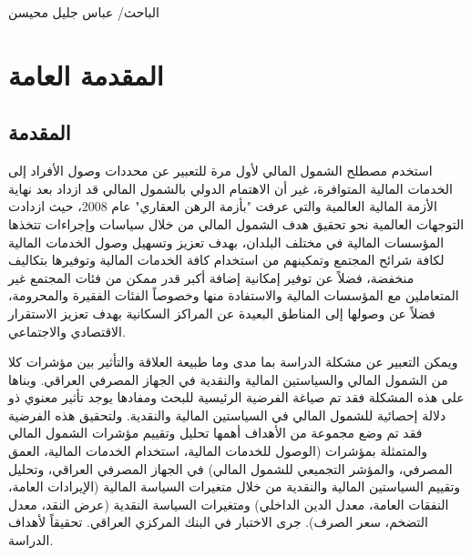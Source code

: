 \documentclass[10pt,a4paper]{report}
\begin{document}
\begin{doublespacing}
\bigskip
\bigskip
\bigskip
\begin{flushleft}
	\Large{الباحث/}
\Large{عباس جليل محيسن}
\end{flushleft}
\newpage

\tableofcontents	

\pagestyle{plain}
\cleardoublepage
{}%
\pagestyle{plain}
\listoftables
\cleardoublepage
\pagestyle{plain}
\listoffigures
{}%
\clearpage
{} 
\chapter*{المقدمة العامة}
\thispagestyle{empty}
\pagestyle{otherstyle}
\newpage
\section*{المقدمة}
استخدم مصطلح الشمول المالي لأول مرة للتعبير عن محددات وصول الأفراد إلى الخدمات المالية المتوافرة، غير أن الاهتمام الدولي بالشمول المالي قد ازداد بعد نهاية الأزمة المالية العالمية والتي عرفت "بأزمة الرهن العقاري" عام 2008، حيث ازدادت التوجهات العالمية نحو تحقيق هدف الشمول المالي من خلال سياسات وإجراءات تتخذها المؤسسات المالية في مختلف البلدان، بهدف تعزيز وتسهيل وصول الخدمات المالية لكافة شرائح المجتمع وتمكينهم من استخدام كافة الخدمات المالية وتوفيرها بتكاليف منخفضة، فضلاً عن توفير إمكانية إضافة أكبر قدر ممكن من فئات المجتمع غير المتعاملين مع المؤسسات المالية والاستفادة منها وخصوصاً الفئات الفقيرة والمحرومة، فضلاً عن وصولها إلى المناطق البعيدة عن المراكز السكانية بهدف تعزيز الاستقرار الاقتصادي والاجتماعي.

ويمكن التعبير عن مشكلة الدراسة بما مدى وما طبيعة العلاقة والتأثير بين مؤشرات كلا من الشمول المالي والسياستين المالية والنقدية في الجهاز المصرفي العراقي. وبناها على هذه المشكلة فقد تم صياغة الفرضية الرئيسية للبحث ومفادها يوجد تأثير معنوي ذو دلالة إحصائية للشمول المالي في السياستين المالية والنقدية. ولتحقيق هذه الفرضية فقد تم وضع مجموعة من الأهداف أهمها تحليل وتقييم مؤشرات الشمول المالي والمتمثلة بمؤشرات (الوصول للخدمات المالية، استخدام الخدمات المالية، العمق المصرفي، والمؤشر التجميعي للشمول المالي) في الجهاز المصرفي العراقي، وتحليل وتقييم السياستين المالية والنقدية من خلال متغيرات السياسة المالية (الإيرادات العامة، النفقات العامة، معدل الدين الداخلي) ومتغيرات السياسة النقدية (عرض النقد، معدل التضخم، سعر الصرف). جرى الاختبار في البنك المركزي العراقي. تحقيقاً لأهداف الدراسة.


\end{doublespacing}
\end{document}
